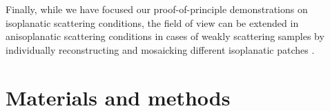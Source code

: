 \documentclass[pdflatex,sn-mathphys-num]{sn-jnl}%
\theoremstyle{thmstyleone}%
\theoremstyle{thmstyletwo}%
\theoremstyle{thmstylethree}%
\begin{document}


Finally, while we have focused our proof-of-principle demonstrations on isoplanatic scattering conditions, the field of view can be extended in anisoplanatic scattering conditions in cases of weakly scattering samples by individually reconstructing and mosaicking different isoplanatic patches \cite{trussell1978sectioned,alterman2021imaging,lee22,najar2024harnessing,sunray2024beyond}.



\section*{Materials and methods}
\end{document}
